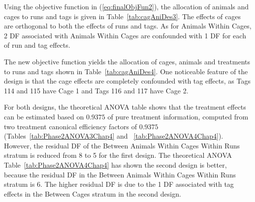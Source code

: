 
Using the objective function in (\ref{eq:finalObjFun2}), the allocation of animals and cages to runs and tags is given in Table~\ref{tab:cagAniDes3}. The effects of cages are orthogonal to both the effects of runs and tags. As for Animals Within Cages, 2 DF associated with Animals Within Cages are confounded with 1 DF for each of run and tag effects. 
 
The new objective function yields the allocation of cages, animals and treatments to runs and tags shown in Table~\ref{tab:cagAniDes4}. One noticeable feature of the design is that the cage effects are completely confounded with tag effects, as Tags 114 and 115 have Cage 1 and Tags 116 and 117 have Cage 2. 

For both designs, the theoretical ANOVA table shows that the treatment effects can be estimated based on $0.9375$ of pure treatment information, computed from two treatment canonical efficiency factors of $0.9375$ (Tables~\ref{tab:Phase2ANOVA3Chap4} and ~\ref{tab:Phase2ANOVA4Chap4}). However, the residual DF of the Between Animals Within Cages Within Runs stratum is reduced from 8 to 5 for the first design. The theoretical ANOVA Table~\ref{tab:Phase2ANOVA4Chap4} has shown the second design is better, because the residual DF in the Between Animals Within Cages Within Runs stratum is 6. The higher residual DF is due to the 1 DF associated with tag effects in the Between Cages stratum in the second design. 

